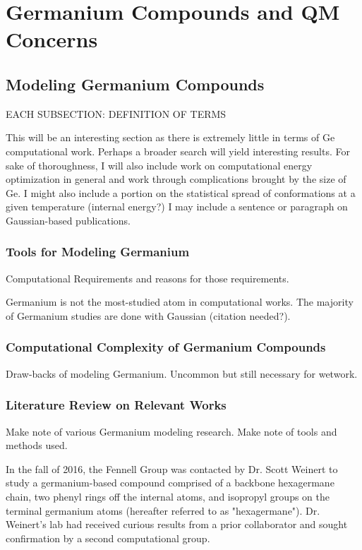 \chapter{Germanium Compounds and QM Concerns}
\label{ch:Germanium}

\section{Modeling Germanium Compounds}

EACH SUBSECTION: DEFINITION OF TERMS

This will be an interesting section as there is extremely little in terms of Ge computational work. Perhaps a broader search will yield interesting results. For sake of thoroughness, I will also include work on computational energy optimization in general and work through complications brought by the size of Ge. I might also include a portion on the statistical spread of conformations at a given temperature (internal energy?) I may include a sentence or paragraph on Gaussian-based publications. 

\subsection{Tools for Modeling Germanium}

Computational Requirements and reasons for those requirements.

Germanium is not the most-studied atom in computational works.
The majority of Germanium studies are done with Gaussian (citation needed?).

\subsection{Computational Complexity of Germanium Compounds}

Draw-backs of modeling Germanium. Uncommon but still necessary for wetwork.

\subsection{Literature Review on Relevant Works}

Make note of various Germanium modeling research. Make note of tools and methods used.









In the fall of 2016, the Fennell Group was contacted by Dr. Scott Weinert to study a germanium-based compound comprised of a backbone hexagermane chain, two phenyl rings off the internal atoms, and isopropyl groups on the terminal germanium atoms (hereafter referred to as "hexagermane"). 
Dr. Weinert's lab had received curious results from a prior collaborator and sought confirmation by a second computational group. 

